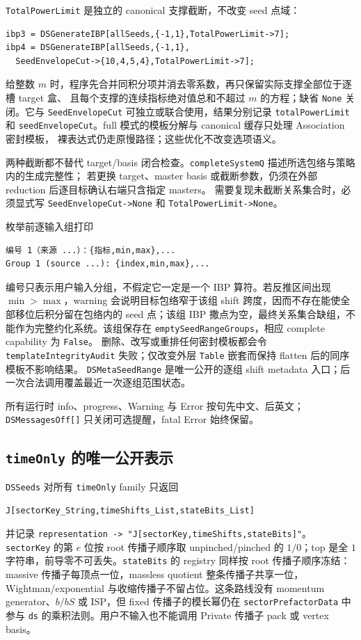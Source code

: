 ﻿\documentclass[a4paper,11pt]{article}
\begin{document}
\texttt{TotalPowerLimit} 是独立的 canonical 支撑截断，不改变 seed 点域：
\begin{verbatim}
ibp3 = DSGenerateIBP[allSeeds,{-1,1},TotalPowerLimit->7];
ibp4 = DSGenerateIBP[allSeeds,{-1,1},
  SeedEnvelopeCut->{10,4,5,4},TotalPowerLimit->7];
\end{verbatim}
给整数 $m$ 时，程序先合并同积分项并消去零系数，再只保留实际支撑全部位于逐槽 target 盒、
且每个支撑的连续指标绝对值总和不超过 $m$ 的方程；缺省 \texttt{None} 关闭。它与
\texttt{SeedEnvelopeCut} 可独立或联合使用，结果分别记录 \texttt{totalPowerLimit} 和
\texttt{seedEnvelopeCut}。full 模式的模板分解与 canonical 缓存只处理 Association 密封模板，
裸表达式仍走原慢路径；这些优化不改变选项语义。

两种截断都不替代 target/basis 闭合检查。\texttt{completeSystemQ} 描述所选包络与策略内的生成完整性；
若更换 target、master basis 或截断参数，仍须在外部 reduction 后逐目标确认右端只含指定 masters。
需要复现未截断关系集合时，必须显式写 \texttt{SeedEnvelopeCut->None} 和
\texttt{TotalPowerLimit->None}。

枚举前逐输入组打印
\begin{verbatim}
编号 1（来源 ...）：{指标,min,max},...
Group 1 (source ...): {index,min,max},...
\end{verbatim}
编号只表示用户输入分组，不假定它一定是一个 IBP 算符。若反推区间出现 $\min>\max$，warning
会说明目标包络窄于该组 shift 跨度，因而不存在能使全部移位后积分留在包络内的 seed 点；该组
IBP 撒点为空，最终关系集合缺组，不能作为完整约化系统。该组保存在
\texttt{emptySeedRangeGroups}，相应 complete capability 为 \texttt{False}。
删除、改写或重排任何密封模板都会令 \texttt{templateIntegrityAudit} 失败；仅改变外层
\texttt{Table} 嵌套而保持 flatten 后的同序模板不影响结果。
\texttt{DSMetaSeedRange} 是唯一公开的逐组 shift metadata 入口；后一次合法调用覆盖最近一次逐组范围状态。

所有运行时 info、progress、Warning 与 Error 按句先中文、后英文；
\texttt{DSMessagesOff[]} 只关闭可选提醒，fatal Error 始终保留。

\subsection{\texttt{timeOnly} 的唯一公开表示}
\label{sec:timeOnlyRepresentations}

\texttt{DSSeeds} 对所有 \texttt{timeOnly} family 只返回
\begin{verbatim}
J[sectorKey_String,timeShifts_List,stateBits_List]
\end{verbatim}
并记录 \texttt{representation -> "J[sectorKey,timeShifts,stateBits]"}。\texttt{sectorKey} 的第 $e$ 位按 root 传播子顺序取 unpinched/pinched 的 $1/0$；top 是全 $1$ 字符串，前导零不可丢失。\texttt{stateBits} 的 registry 同样按 root 传播子顺序冻结：massive 传播子每顶点一位，massless quotient 整条传播子共享一位，Wightman/exponential 与收缩传播子不留占位。这条路线没有 momentum generator、$b/bS$ 或 ISP，但 fixed 传播子的模长幂仍在 \texttt{sectorPrefactorData} 中参与 \texttt{ds} 的乘积法则。用户不输入也不能调用 Private 传播子 pack 或 vertex basis。
\end{document}
